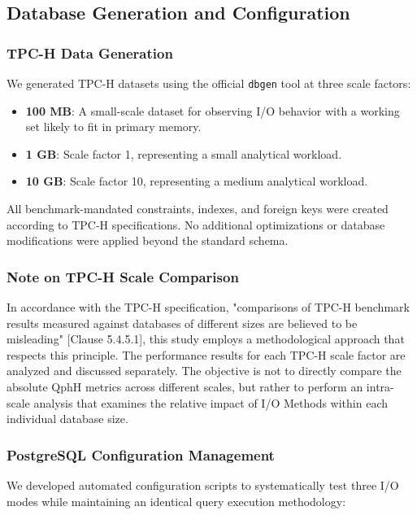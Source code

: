 \documentclass[conference]{IEEEtran}
\begin{document}
\subsection{Database Generation and Configuration}

\subsubsection{TPC-H Data Generation}
We generated TPC-H datasets using the official \texttt{dbgen} tool at three scale factors:
\begin{itemize}
    \item \textbf{100 MB}: A small-scale dataset for observing I/O behavior with a working set likely to fit in primary memory.
    \item \textbf{1 GB}: Scale factor 1, representing a small analytical workload.
    \item \textbf{10 GB}: Scale factor 10, representing a medium analytical workload.
\end{itemize}

All benchmark-mandated constraints, indexes, and foreign keys were created according to TPC-H specifications. No additional optimizations or database modifications were applied beyond the standard schema.

\subsubsection{Note on TPC-H Scale Comparison}
In accordance with the TPC-H specification, "comparisons of TPC-H benchmark results measured against databases of different sizes are believed to be misleading" [Clause 5.4.5.1], this study employs a methodological approach that respects this principle. The performance results for each TPC-H scale factor are analyzed and discussed separately. The objective is not to directly compare the absolute QphH metrics across different scales, but rather to perform an intra-scale analysis that examines the relative impact of I/O Methods within each individual database size.

\subsubsection{PostgreSQL Configuration Management}

We developed automated configuration scripts to systematically test three I/O modes while maintaining an identical query execution methodology:
\end{document}
